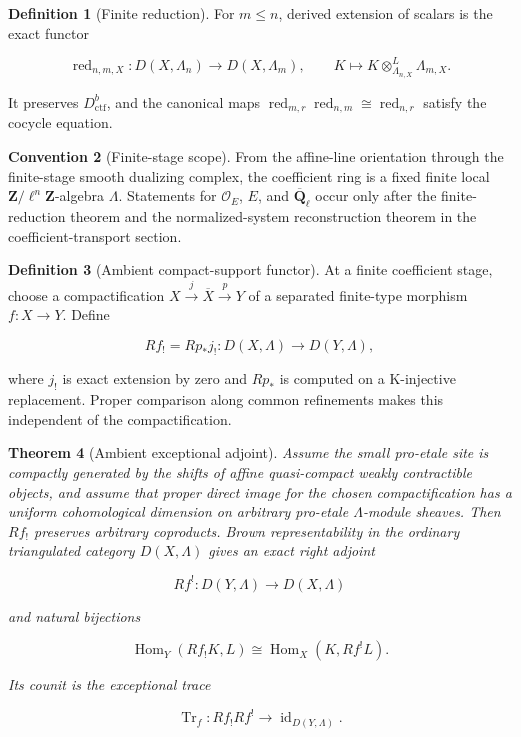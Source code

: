 \documentclass[10pt]{article}
\newtheorem{theorem}{Theorem}[section]
\theoremstyle{definition}
\newtheorem{definition}[theorem]{Definition}
\newtheorem{convention}[theorem]{Convention}
\newcommand{\Qlb}{\overline{\mathbf Q}_\ell}
\newcommand{\OO}{\mathcal O}
\newcommand{\Dctf}{D^b_{\mathrm{ctf}}}
\newcommand{\red}{\operatorname{red}}
\newcommand{\Tr}{\operatorname{Tr}}
\begin{document}
\begin{definition}[Finite reduction]
For \(m\leq n\), derived extension of scalars is the exact functor

\[
 \red_{n,m,X}:D(X,\Lambda_n)\longrightarrow D(X,\Lambda_m),
 \qquad
 K\longmapsto K\otimes^L_{\Lambda_{n,X}}\Lambda_{m,X}.
\]

It preserves \(\Dctf\), and the canonical maps
\(\red_{m,r}\red_{n,m}\cong\red_{n,r}\) satisfy the cocycle equation.
\end{definition}

\begin{convention}[Finite-stage scope]
From the affine-line orientation through the finite-stage smooth dualizing
complex, the coefficient ring is a fixed finite local
\(\mathbf Z/\ell^n\mathbf Z\)-algebra \(\Lambda\).  Statements for
\(\OO_E\), \(E\), and \(\Qlb\) occur only after the finite-reduction theorem
and the normalized-system reconstruction theorem in the coefficient-transport
section.
\end{convention}

\begin{definition}[Ambient compact-support functor]
At a finite coefficient stage, choose a compactification
\(X\xrightarrow j\overline X\xrightarrow pY\) of a separated finite-type
morphism \(f:X\to Y\).  Define

\[
 Rf_!=Rp_*j_!:D(X,\Lambda)\longrightarrow D(Y,\Lambda),
\]

where \(j_!\) is exact extension by zero and \(Rp_*\) is computed on a
K-injective replacement.  Proper comparison along common refinements makes
this independent of the compactification.
\end{definition}

\begin{theorem}[Ambient exceptional adjoint]
Assume the small pro-etale site is compactly generated by the shifts of
affine quasi-compact weakly contractible objects, and assume that proper
direct image for the chosen compactification has a uniform cohomological
dimension on arbitrary pro-etale \(\Lambda\)-module sheaves.  Then \(Rf_!\)
preserves arbitrary coproducts.  Brown representability in the ordinary
triangulated category \(D(X,\Lambda)\) gives an exact right adjoint

\[
 Rf^!:D(Y,\Lambda)\longrightarrow D(X,\Lambda)
\]

and natural bijections

\[
 \operatorname{Hom}_Y(Rf_!K,L)
 \cong\operatorname{Hom}_X(K,Rf^!L).
\]

Its counit is the exceptional trace

\[
 \Tr_f:Rf_!Rf^!\longrightarrow\operatorname{id}_{D(Y,\Lambda)}.
\]
\end{theorem}
\end{document}
